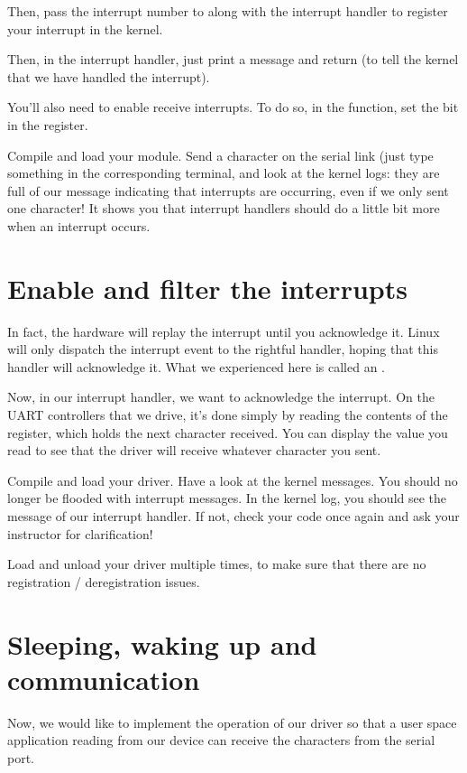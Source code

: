 Then, pass the interrupt number to  along
with the interrupt handler to register your interrupt in the kernel.

Then, in the interrupt handler, just print a message and return
 (to tell the kernel that we have handled the
interrupt).

You'll also need to enable receive interrupts.
To do so, in the  function, set the
 bit in the  register.

Compile and load your module. Send a character on the serial link (just
type something in the corresponding  terminal, and
look at the kernel logs: they are full of our message indicating that
interrupts are occurring, even if we only sent one character! It shows
you that interrupt handlers should do a little bit more when an
interrupt occurs.

\section{Enable and filter the interrupts}

In fact, the hardware will replay the interrupt until you acknowledge
it. Linux will only dispatch the interrupt event to the rightful
handler, hoping that this handler will acknowledge it. What we
experienced here is called an .

Now, in our interrupt handler, we want to acknowledge the
interrupt. On the UART controllers that we drive, it's done simply by
reading the contents of the  register, which holds the
next character received. You can display the value you read to see
that the driver will receive whatever character you sent.

Compile and load your driver. Have a look at the kernel messages. You
should no longer be flooded with interrupt messages. In the kernel
log, you should see the message of our interrupt handler. If not,
check your code once again and ask your instructor for clarification!

Load and unload your driver multiple times, to make sure that 
there are no registration / deregistration issues.

\section{Sleeping, waking up and communication}

Now, we would like to implement the  operation of our
driver so that a user space application reading from our device can
receive the characters from the serial port.

